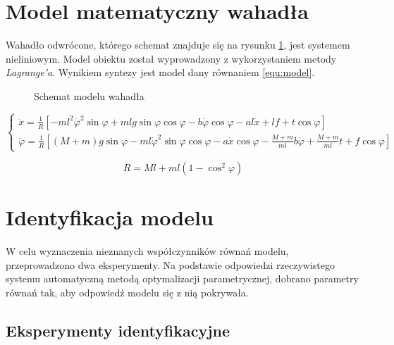 \documentclass[12pt]{article}
\begin{document}


\section{Model matematyczny wahadła}

Wahadło odwrócone, którego schemat znajduje się na rysunku \ref{rys:smodel},
jest systemem nieliniowym. Model obiektu został wyprowadzony z wykorzystaniem
metody \textit{Lagrange'a}. Wynikiem syntezy jest model dany równaniem
\eqref{equ:model}.

\begin{figure}[!htb] 
  \begin{center}
    
    \caption{Schemat modelu wahadła}
    \label{rys:smodel} 
  \end{center}
\end{figure}

\begin{equation}
    \begin{cases}
    \ddot{x} = \frac{1}{R}\left[
    -ml^2\dot{\varphi}^2\sin{\varphi}
    +mlg\sin{\varphi}\cos{\varphi}
    -b\dot{\varphi}\cos{\varphi}
    -al\dot{x}
    +lf
    +t\cos{\varphi}\right] \\
    
    \ddot{\varphi} = \frac{1}{R}\left[
    (M+m)g\sin{\varphi}
    -ml\dot{\varphi}^2\sin{\varphi}\cos{\varphi}
    -a\dot{x}\cos{\varphi}
    -\frac{M+m}{ml}b\dot{\varphi}
    +\frac{M+m}{ml}t
    +f\cos{\varphi}\right]
    \end{cases}
    \label{equ:model}
\end{equation}

\begin{equation*}
    R = Ml + ml(1 - \cos^2{\varphi})
\end{equation*}

\newpage

\section{Identyfikacja modelu}

W celu wyznaczenia nieznanych współczynników równań modelu, przeprowadzono dwa
eksperymenty. Na podstawie odpowiedzi rzeczywistego systemu automatyczną metodą
optymalizacji parametrycznej, dobrano parametry równań tak, aby odpowiedź
modelu się z nią pokrywała.

\subsection{Eksperymenty identyfikacyjne}
\end{document}
